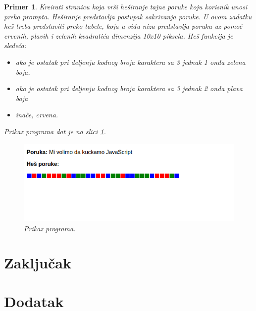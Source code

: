 \documentclass[a4paper]{article}
\newtheorem{primer}{Primer}[section]
\begin{document}
\begin{primer}
Kreirati stranicu koja vrši heširanje tajne poruke koju korisnik unosi preko prompta. Heširanje predstavlja postupak sakrivanja poruke. U ovom zadatku heš treba predstaviti preko tabele, koja u vidu niza predstavlja poruku uz pomoć crvenih, plavih i zelenih kvadratića dimenzija 10x10 piksela. Heš funkcija je sledeća:
\begin{itemize}
\item ako je ostatak pri deljenju kodnog broja karaktera sa 3 jednak 1 onda zelena boja,
\item ako je ostatak pri deljenju kodnog broja karaktera sa 3 jednak 2 onda plava boja
\item inače, crvena. 
\end{itemize}
Prikaz programa dat je na slici \ref{fig:hes}.
\begin{figure}[h!]
\begin{center}
\includegraphics[scale=0.5]{pictures/hes.png}
\end{center}
\caption{Prikaz programa.}
\label{fig:hes}
\end{figure}

\end{primer}


\section{Zaključak}
\label{sec:zakljucak}

 


\appendix
\section{Dodatak}
\end{document}
